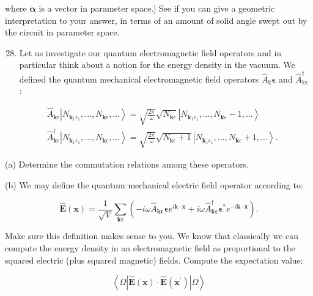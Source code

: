\documentclass[10pt]{article}
\begin{document}
where $\boldsymbol{\alpha}$ is a vector in parameter space.] See if you can give a geometric interpretation to your answer, in terms of an amount of solid angle swept out by the circuit in parameter space.

\begin{enumerate}
  \setcounter{enumi}{27}
  \item Let us investigate our quantum electromagnetic field operators and in particular think about a notion for the energy density in the vacuum. We defined the quantum mechanical electromagnetic field operators $\hat{A}_{\mathrm{k}} \boldsymbol{\epsilon}$ and $\hat{A}_{\mathrm{k} \boldsymbol{\epsilon}}^{\dagger}$ :
\end{enumerate}


\begin{align*}
& \hat{A}_{\mathbf{k} \epsilon}\left|N_{\mathbf{k}_{1} \epsilon_{1}}, \ldots, N_{\mathbf{k} \epsilon}, \ldots\right\rangle=\sqrt{\frac{2 \pi}{\omega}} \sqrt{N_{\mathbf{k} \epsilon}}\left|N_{\mathbf{k}_{1} \epsilon_{1}}, \ldots, N_{\mathbf{k} \epsilon}-1, \ldots\right\rangle  \tag{5}\\
& \hat{A}_{\mathbf{k} \epsilon}^{\dagger}\left|N_{\mathbf{k}_{1} \epsilon_{1}}, \ldots, N_{\mathbf{k} \epsilon}, \ldots\right\rangle=\sqrt{\frac{2 \pi}{\omega}} \sqrt{N_{\mathbf{k} \epsilon}+1}\left|N_{\mathbf{k}_{1} \epsilon_{1}}, \ldots, N_{\mathbf{k} \epsilon}+1, \ldots\right\rangle . \tag{6}
\end{align*}


(a) Determine the commutation relations among these operators.

(b) We may define the quantum mechanical electric field operator according to:


\begin{equation*}
\hat{\mathbf{E}}(\mathbf{x})=\frac{1}{\sqrt{V}} \sum_{\mathbf{k} \boldsymbol{\epsilon}}\left(-i \omega \hat{A}_{\mathbf{k} \boldsymbol{\epsilon}} \boldsymbol{\epsilon} e^{i \mathbf{k} \cdot \mathbf{x}}+i \omega \hat{A}_{\mathbf{k} \boldsymbol{\epsilon}}^{\dagger} \boldsymbol{\epsilon}^{*} e^{-i \mathbf{k} \cdot \mathbf{x}}\right) . \tag{7}
\end{equation*}


Make sure this definition makes sense to you. We know that classically we can compute the energy density in an electromagnetic field as proportional to the squared electric (plus squared magnetic) fields. Compute the expectation value:


\begin{equation*}
\left\langle\Omega\left|\hat{\mathbf{E}}(\mathbf{x}) \cdot \hat{\mathbf{E}}\left(\mathbf{x}^{\prime}\right)\right| \Omega\right\rangle \tag{8}
\end{equation*}
\end{document}
